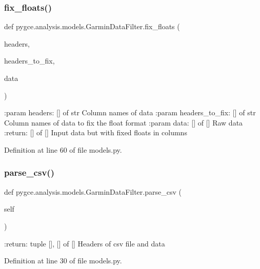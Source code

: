 \subsubsection{\texorpdfstring{fix\+\_\+floats()}{fix\_floats()}}
{\footnotesize\ttfamily def pygce.\+analysis.\+models.\+Garmin\+Data\+Filter.\+fix\+\_\+floats (\begin{DoxyParamCaption}\item[{}]{headers,  }\item[{}]{headers\+\_\+to\+\_\+fix,  }\item[{}]{data }\end{DoxyParamCaption})\hspace{0.3cm}{\ttfamily [static]}}

\begin{DoxyVerb}:param headers: [] of str
    Column names of data
:param headers_to_fix: [] of str
    Column names of data to fix the float format
:param data: [] of []
    Raw data
:return: [] of []
    Input data but with fixed floats in columns
\end{DoxyVerb}
 

Definition at line 60 of file models.\+py.

\mbox{\label{classpygce_1_1analysis_1_1models_1_1_garmin_data_filter_ae502093f9a92b498b42dd8b0257c22dd}} 
\subsubsection{\texorpdfstring{parse\+\_\+csv()}{parse\_csv()}}
{\footnotesize\ttfamily def pygce.\+analysis.\+models.\+Garmin\+Data\+Filter.\+parse\+\_\+csv (\begin{DoxyParamCaption}\item[{}]{self }\end{DoxyParamCaption})}

\begin{DoxyVerb}:return: tuple [], [] of []
    Headers of csv file and data
\end{DoxyVerb}
 

Definition at line 30 of file models.\+py.



